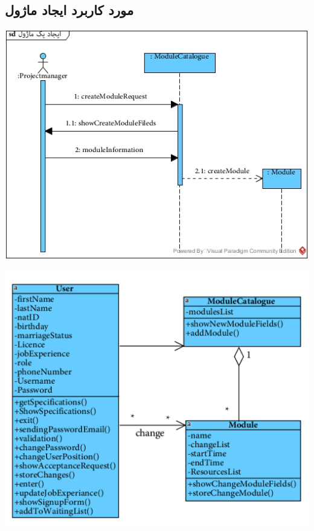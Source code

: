 \subsection*{مورد کاربرد ایجاد ماژول}
\vspace{2cm}
\begin{center}
\includegraphics[width=\textwidth]{SequenceDiagrams/27.jpg}
\end{center}

\newpage
\vspace{2cm}
\begin{center}
\includegraphics[width=\textwidth]{SequenceClasses/27.png}
\end{center}


